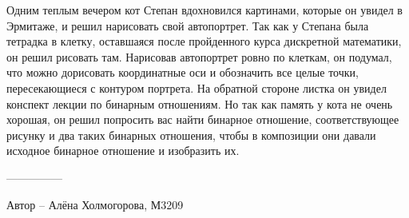 \question
Одним теплым вечером кот Степан вдохновился картинами, которые он увидел в Эрмитаже, и решил нарисовать свой автопортрет. Так как у Степана была тетрадка в клетку, оставшаяся после пройденного курса дискретной математики, он решил рисовать там. Нарисовав автопортрет ровно по клеткам, он подумал, что можно дорисовать координатные оси и обозначить все целые точки, пересекающиеся с контуром портрета. На обратной стороне листка он увидел конспект лекции по бинарным отношениям. Но так как память у кота не очень хорошая, он решил попросить вас найти бинарное отношение, соответствующее рисунку и два таких бинарных отношения, чтобы в композиции они давали исходное бинарное отношение и изобразить их.
\\
\begin{figure}[h]

\begin{minipage}[h]{0.55\linewidth}
\end{minipage}
\begin{minipage}[h]{0.45\linewidth}
\end{minipage}
\end{figure}



---------------

Автор -- Алёна Холмогорова, М3209